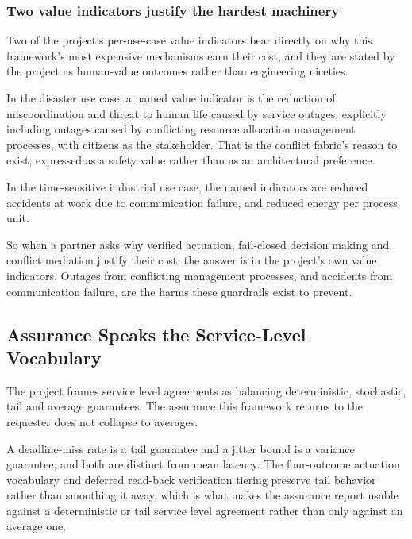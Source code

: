 \hypertarget{two-value-indicators-justify-the-hardest-machinery}{%
\subsubsection{Two value indicators justify the hardest machinery}\label{two-value-indicators-justify-the-hardest-machinery}}

Two of the project's per-use-case value indicators bear directly on why
this framework's most expensive mechanisms earn their cost, and they are
stated by the project as human-value outcomes rather than engineering
niceties.

In the disaster use case, a named value indicator is the reduction of
miscoordination and threat to human life caused by service outages,
explicitly including outages caused by conflicting resource allocation
management processes, with citizens as the stakeholder. That is the
conflict fabric's reason to exist, expressed as a safety value rather
than as an architectural preference.

In the time-sensitive industrial use case, the named indicators are
reduced accidents at work due to communication failure, and reduced
energy per process unit.

So when a partner asks why verified actuation, fail-closed decision
making and conflict mediation justify their cost, the answer is in the
project's own value indicators. Outages from conflicting management
processes, and accidents from communication failure, are the harms these
guardrails exist to prevent.

\hypertarget{assurance-speaks-the-service-level-vocabulary}{%
\subsection{Assurance Speaks the Service-Level Vocabulary}\label{assurance-speaks-the-service-level-vocabulary}}

The project frames service level agreements as balancing deterministic,
stochastic, tail and average guarantees. The assurance this framework
returns to the requester does not collapse to averages.

A deadline-miss rate is a tail guarantee and a jitter bound is a
variance guarantee, and both are distinct from mean latency. The
four-outcome actuation vocabulary and deferred read-back verification
tiering preserve tail behavior rather than smoothing it away, which is
what makes the assurance report usable against a deterministic or tail
service level agreement rather than only against an average one.

